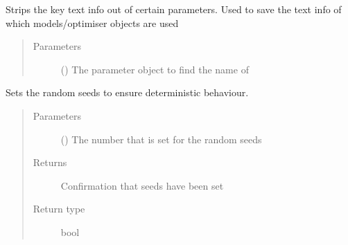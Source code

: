 \documentclass[letterpaper,10pt,english]{sphinxmanual}
\begin{document}

\begin{fulllineitems}
\label{\detokenize{index:Forecaster.deeplearning.param_strip}}
Strips the key text info out of certain parameters.
Used to save the text info of which models/optimiser objects are used
\begin{quote}\begin{description}
\item[{Parameters}] \leavevmode
{} () \textendash{} The parameter object to find the name of

\end{description}\end{quote}

\end{fulllineitems}


\begin{fulllineitems}
\label{\detokenize{index:Forecaster.deeplearning.set_seed}}
Sets the random seeds to ensure deterministic behaviour.
\begin{quote}\begin{description}
\item[{Parameters}] \leavevmode
{} () \textendash{} The number that is set for the random seeds

\item[{Returns}] \leavevmode
Confirmation that seeds have been set

\item[{Return type}] \leavevmode
bool

\end{description}\end{quote}

\end{fulllineitems}
\end{document}
